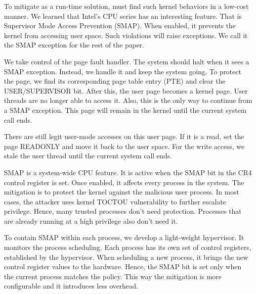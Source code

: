 To mitigate as a run-time solution, must find such kernel behaviors in a low-cost manner. We learned that Intel's CPU series has an interesting feature. That is Supervisor Mode Access Prevention (SMAP). When enabled, it prevents the kernel from accessing user space. Such violations will raise exceptions. We call it the SMAP exception for the rest of the paper.

We take control of the page fault handler.  The system should halt when it sees a SMAP exception.  Instead, we handle it and keep the system going. To protect the page, we find its corresponding page table entry (PTE) and clear the USER/SUPERVISOR bit. After this, the user page becomes a kernel page. User threads are no longer able to access it. Also, this is the only way to continue from a SMAP exception.  This page will remain in the kernel until the current system call ends.

There are still legit user-mode accesses on this user page. If it is a read, set the page READONLY and move it back to the user space. 
For the write access, we stale the user thread until the current system call ends.


SMAP is a system-wide CPU feature. It is active when the SMAP bit in the CR4 control register is set.  Once enabled, it affects every process in the system. The mitigation is to protect the kernel against the malicious user process. In most cases, the attacker uses kernel TOCTOU vulnerability to further escalate privilege. Hence, many trusted processes don't need protection. Processes that are already running at a high privilege also don't need it. 

To contain SMAP within each process, we develop a light-weight hypervisor. It monitors the process scheduling. Each process has its own set of control registers, established by the hypervisor. When scheduling a new process, it brings the new control register values to the hardware. Hence, the SMAP bit is set only when the current process matches the policy. This way the mitigation is more configurable and it introduces less overhead.

